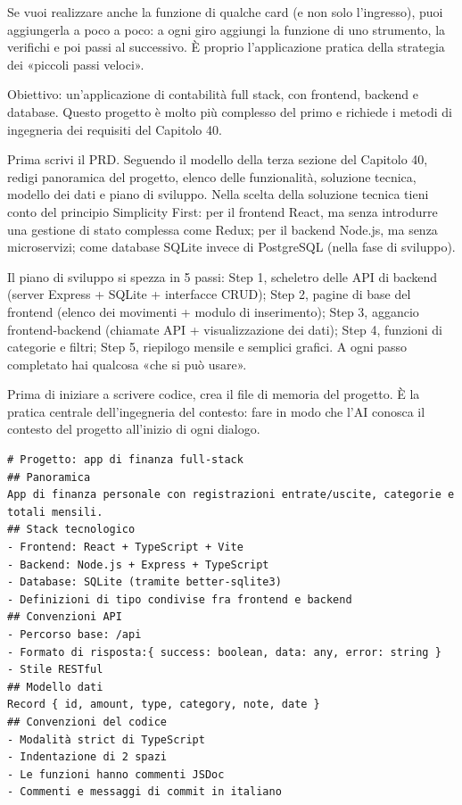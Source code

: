 Se vuoi realizzare anche la funzione di qualche card (e non solo l'ingresso), puoi aggiungerla a poco a poco: a ogni giro aggiungi la funzione di uno strumento, la verifichi e poi passi al successivo. È proprio l'applicazione pratica della strategia dei «piccoli passi veloci».



Obiettivo: un'applicazione di contabilità full stack, con frontend, backend e database. Questo progetto è molto più complesso del primo e richiede i metodi di ingegneria dei requisiti del Capitolo 40.

Prima scrivi il PRD. Seguendo il modello della terza sezione del Capitolo 40, redigi panoramica del progetto, elenco delle funzionalità, soluzione tecnica, modello dei dati e piano di sviluppo. Nella scelta della soluzione tecnica tieni conto del principio Simplicity First: per il frontend React, ma senza introdurre una gestione di stato complessa come Redux; per il backend Node.js, ma senza microservizi; come database SQLite invece di PostgreSQL (nella fase di sviluppo).

Il piano di sviluppo si spezza in 5 passi: Step 1, scheletro delle API di backend (server Express + SQLite + interfacce CRUD); Step 2, pagine di base del frontend (elenco dei movimenti + modulo di inserimento); Step 3, aggancio frontend-backend (chiamate API + visualizzazione dei dati); Step 4, funzioni di categorie e filtri; Step 5, riepilogo mensile e semplici grafici. A ogni passo completato hai qualcosa «che si può usare».


Prima di iniziare a scrivere codice, crea il file di memoria del progetto. È la pratica centrale dell'ingegneria del contesto: fare in modo che l'AI conosca il contesto del progetto all'inizio di ogni dialogo.

\begin{lstlisting}
# Progetto: app di finanza full-stack
## Panoramica
App di finanza personale con registrazioni entrate/uscite, categorie e totali mensili.
## Stack tecnologico
- Frontend: React + TypeScript + Vite
- Backend: Node.js + Express + TypeScript
- Database: SQLite (tramite better-sqlite3)
- Definizioni di tipo condivise fra frontend e backend
## Convenzioni API
- Percorso base: /api
- Formato di risposta:{ success: boolean, data: any, error: string }
- Stile RESTful
## Modello dati
Record { id, amount, type, category, note, date }
## Convenzioni del codice
- Modalità strict di TypeScript
- Indentazione di 2 spazi
- Le funzioni hanno commenti JSDoc
- Commenti e messaggi di commit in italiano
\end{lstlisting}

